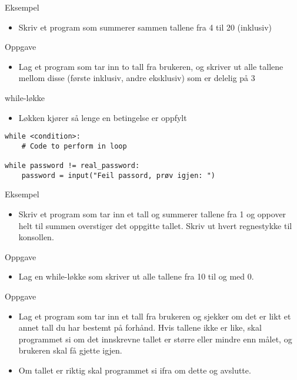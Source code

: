 \documentclass[screen, aspectratio=169]{beamer}
\begin{document}
\begin{frame}{Eksempel}
	\begin{itemize}
		\item Skriv et program som summerer sammen tallene fra 4 til 20 (inklusiv)
	\end{itemize}
\end{frame}

\begin{frame}{Oppgave}
	\begin{itemize}
		\item Lag et program som tar inn to tall fra brukeren, og skriver ut alle tallene mellom disse (første inklusiv, andre eksklusiv) som er delelig på 3
	\end{itemize}
\end{frame}

\begin{frame}[fragile]{while-løkke}
	\begin{itemize}
		\item Løkken kjører så lenge en betingelse er oppfylt
	\end{itemize}
	\begin{lstlisting}
while <condition>:
	# Code to perform in loop

while password != real_password:
	password = input("Feil passord, prøv igjen: ")
	\end{lstlisting}
\end{frame}

\begin{frame}{Eksempel}
	\begin{itemize}
		\item Skriv et program som tar inn et tall og summerer tallene fra 1 og oppover helt til summen overstiger det oppgitte tallet. Skriv ut hvert regnestykke til konsollen.
	\end{itemize}
\end{frame}

\begin{frame}{Oppgave}
	\begin{itemize}
		\item Lag en while-løkke som skriver ut alle tallene fra 10 til og med 0.
	\end{itemize}
\end{frame}

\begin{frame}{Oppgave}
	\begin{itemize}
		\item Lag et program som tar inn et tall fra brukeren og sjekker om det er likt et annet tall du har bestemt på forhånd. Hvis tallene ikke er like, skal programmet si om det innskrevne tallet er større eller mindre enn målet, og brukeren skal få gjette igjen.
		\item Om tallet er riktig skal programmet si ifra om dette og avslutte.
	\end{itemize}
\end{frame}
\end{document}
